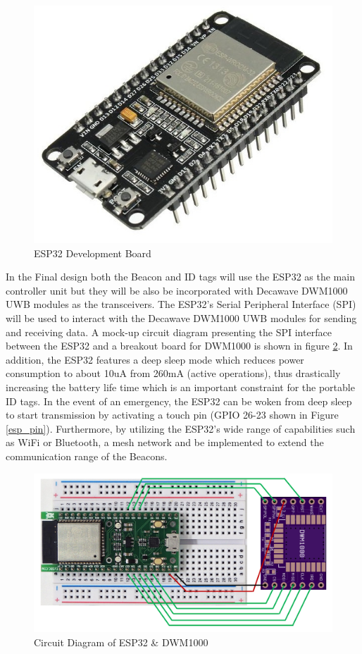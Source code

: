 \begin{figure}[H]
\centering
    \includegraphics[scale=0.25]{./images/esp.jpg}
    \caption{ESP32 Development Board}
    \label{esp}
\end{figure}


\pagebreak
In the Final design both the Beacon and ID tags will use the ESP32 as the main controller unit but they will be also be incorporated with Decawave DWM1000 UWB modules as the transceivers. The ESP32’s Serial Peripheral Interface (SPI) will be used to interact with the Decawave DWM1000 UWB modules for sending and receiving data. A mock-up circuit diagram presenting the SPI interface between the ESP32 and a breakout board for DWM1000 is shown in figure \ref{eps_dwm_circuit}. In addition, the ESP32 features a deep sleep mode which reduces power consumption to about 10uA from 260mA (active operations), thus drastically increasing the battery life time which is an important constraint for the portable ID tags. In the event of an emergency, the ESP32 can be woken from deep sleep to start transmission by activating a touch pin (\Gls{GPIO} 26-23 shown in Figure \ref{esp_pin}). Furthermore, by utilizing the ESP32's wide range of capabilities such as WiFi or Bluetooth, a mesh network and be implemented to extend the communication range of the Beacons. 

\medskip
\begin{figure}[H]
\centering
    \includegraphics[scale=0.5]{./images/eps_dwm_circuit.png}
    \caption{Circuit Diagram of ESP32 \& DWM1000}
    \label{eps_dwm_circuit}
\end{figure}

